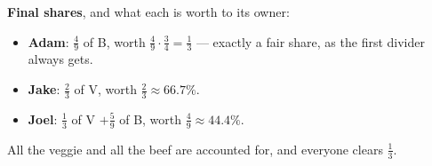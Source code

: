 \documentclass[12pt]{ximera}
\begin{document}
\begin{problem}
\begin{prompt}
\begin{feedback}
\textbf{Final shares}, and what each is worth to its owner:
\begin{itemize}
\item \textbf{Adam}: $\frac49$ of B, worth $\frac49\cdot\frac34 = \frac13$ --- exactly a
      fair share, as the first divider always gets.
\item \textbf{Jake}: $\frac23$ of V, worth $\frac23 \approx 66.7\%$.
\item \textbf{Joel}: $\frac13$ of V $+\frac59$ of B, worth $\frac49 \approx 44.4\%$.
\end{itemize}
All the veggie and all the beef are accounted for, and everyone clears $\frac13$.
\checkmark
\end{feedback}
\end{prompt}
\end{problem}
\end{document}
